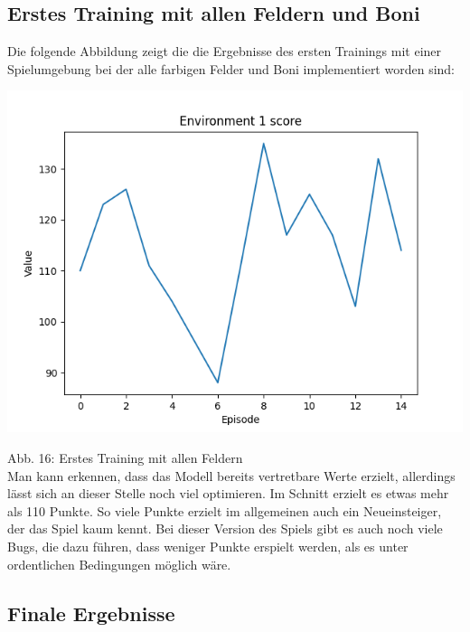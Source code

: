 \subsection{Erstes Training mit allen Feldern und Boni}
\begin{minipage}{\linewidth}
	Die folgende Abbildung zeigt die die Ergebnisse des ersten Trainings mit einer Spielumgebung bei der alle farbigen Felder und Boni implementiert worden sind:
	
	\vspace{0.5cm}
	\includegraphics[width=1\textwidth]{Bilder/firsttrainingwithallfields}
	
	Abb. 16: Erstes Training mit allen Feldern\\
	
Man kann erkennen, dass das Modell bereits vertretbare Werte erzielt, allerdings lässt sich an dieser Stelle noch viel optimieren. Im Schnitt erzielt es etwas mehr als 110 Punkte. So viele Punkte erzielt im allgemeinen auch ein Neueinsteiger, der das Spiel kaum kennt. Bei dieser Version des Spiels gibt es auch noch viele Bugs, die dazu führen, dass weniger Punkte erspielt werden, als es unter ordentlichen Bedingungen möglich wäre.
\end{minipage}
\subsection{Finale Ergebnisse}
